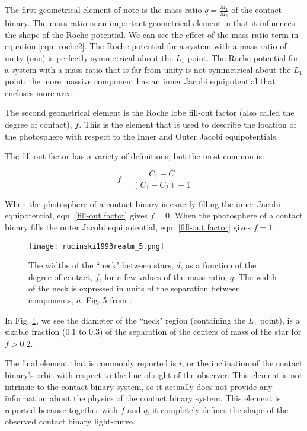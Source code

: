 \documentclass[12pt]{article} %
\numberwithin{equation}{section} %
\begin{document}
The first geometrical element of note is the mass ratio $q = \frac{M_{1}}{M_{2}}$ of the contact binary. The mass ratio is an important geometrical element in that it influences the shape of the Roche potential. We can see the effect of the mass-ratio term in equation \ref{eqn: roche2}. The Roche potential for a system with a mass ratio of unity (one) is perfectly symmetrical about the $L_{1}$ point. The Roche potential for a system with a mass ratio that is far from unity is not symmetrical about the $L_{1}$ point: the more massive component has an inner Jacobi equipotential that encloses more area.

The second geometrical element is the Roche lobe fill-out factor (also called the degree of contact), $f$. This is the element that is used to describe the location of the photosphere with respect to the Inner and Outer Jacobi equipotentials.

The fill-out factor has a variety of definitions, but the most common is:

\begin{equation} \label{fill-out factor}
f = \frac{C_{1} - C}{(C_{1} - C_{2}) + 1}
\end{equation}

When the photosphere of a contact binary is exactly filling the inner Jacobi equipotential, eqn. \ref{fill-out factor} gives $f = 0$. When the photosphere of a contact binary fills the outer Jacobi equipotential, eqn. \ref{fill-out factor} gives $f = 1$.

\begin{figure}[H]
\centering
\texttt{[image: rucinski1993realm\_5.png]}
\caption{The widths of the ``neck" between stars, $d$, as a function of the degree of contact, $f$, for a few values of the mass-ratio, $q$. The width of the neck is expressed in units of the separation between components, $a$. Fig. 5 from \citet{rucinski1993realm}.}
\label{fig: rucinski1993realm_5}
\end{figure}

In Fig. \ref{fig: rucinski1993realm_5}, we see the diameter of the ``neck" region (containing the $L_{1}$ point), is a sizable fraction (0.1 to 0.3) of the separation of the centers of mass of the star for $f > 0.2$.

The final element that is commonly reported is $i$, or the inclination of the contact binary's orbit with respect to the line of sight of the observer. This element is not intrinsic to the contact binary system, so it actually does not provide any information about the physics of the contact binary system. This element is reported because together with $f$ and $q$, it completely defines the shape of the observed contact binary light-curve.
\end{document}
